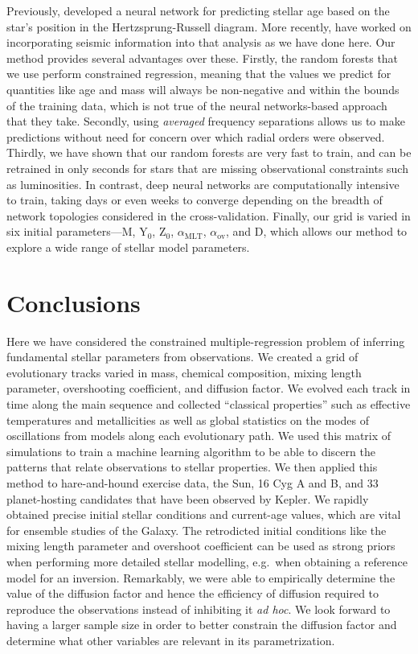 \documentclass[twocolumn,twocolappendix]{aastex6}
\begin{document}
Previously, \citet{pulone1997age} developed a neural network for predicting stellar age based on the star's position in the Hertzsprung-Russell diagram. More recently, \citet{2016arXiv160200902V} have worked on incorporating seismic information into that analysis as we have done here. Our method provides several advantages over these. Firstly, the random forests that we use perform constrained regression, meaning that the values we predict for quantities like age and mass will always be non-negative and within the bounds of the training data, which is not true of the neural networks-based approach that they take. Secondly, using \emph{averaged} frequency separations allows us to make predictions without need for concern over which radial orders were observed. Thirdly, we have shown that our random forests are very fast to train, and can be retrained in only seconds for stars that are missing observational constraints such as luminosities. In contrast, deep neural networks are computationally intensive to train, taking days or even weeks to converge depending on the breadth of network topologies considered in the cross-validation. Finally, our grid is varied in six initial parameters---M, Y$_0$, Z$_0$, $\alpha_{\text{MLT}}$, $\alpha_{\text{ov}}$, and D, which allows our method to explore a wide range of stellar model parameters.


\section{Conclusions}
Here we have considered the constrained multiple-regression problem of inferring fundamental stellar parameters from observations. We created a grid of evolutionary tracks varied in mass, chemical composition, mixing length parameter, overshooting coefficient, and diffusion factor. We evolved each track in time along the main sequence and collected ``classical properties'' such as effective temperatures and metallicities as well as global statistics on the modes of oscillations from models along each evolutionary path. We used this matrix of simulations to train a machine learning algorithm to be able to discern the patterns that relate observations to stellar properties. We then applied this method to hare-and-hound exercise data, the Sun, 16 Cyg A and B, and 33 planet-hosting candidates that have been observed by Kepler. We rapidly obtained precise initial stellar conditions and current-age values, which are vital for ensemble studies of the Galaxy. The retrodicted initial conditions like the mixing length parameter and overshoot coefficient can be used as strong priors when performing more detailed stellar modelling, e.g.\ when obtaining a reference model for an inversion. Remarkably, we were able to empirically determine the value of the diffusion factor and hence the efficiency of diffusion required to reproduce the observations instead of inhibiting it \emph{ad hoc}. We look forward to having a larger sample size in order to better constrain the diffusion factor and determine what other variables are relevant in its parametrization. 
\end{document}
